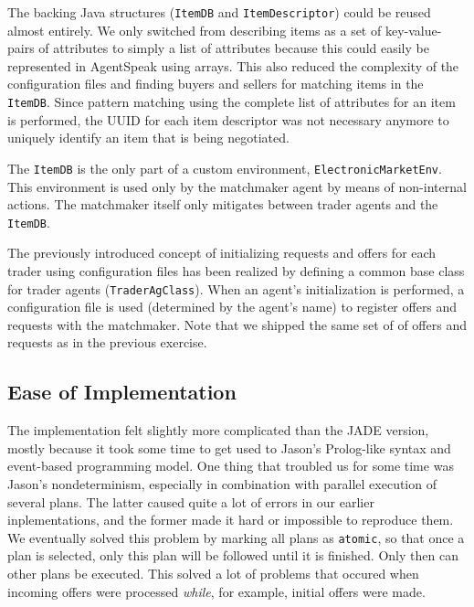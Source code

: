 \documentclass[a4paper,11pt]{article}
\begin{document}
\noindent The backing Java structures (\texttt{ItemDB} and \texttt{ItemDescriptor}) could be reused almost entirely. We only switched from describing items as a set of key-value-pairs of attributes to simply a list of attributes because this could easily be represented in AgentSpeak using arrays. This also reduced the complexity of the configuration files and finding buyers and sellers for matching items in the \texttt{ItemDB}. Since pattern matching using the complete list of attributes for an item is performed, the UUID for each item descriptor was not necessary anymore to uniquely identify an item that is being negotiated.

The \texttt{ItemDB} is the only part of a custom environment, \texttt{ElectronicMarketEnv}. This environment is used only by the matchmaker agent by means of non-internal actions. The matchmaker itself only mitigates between trader agents and the \texttt{ItemDB}.

The previously introduced concept of initializing requests and offers for each trader using configuration files has been realized by defining a common base class for trader agents (\texttt{TraderAgClass}). When an agent's initialization is performed, a configuration file is used (determined by the agent's name) to register offers and requests with the matchmaker. Note that we shipped the same set of of offers and requests as in the previous exercise.


\subsection{Ease of Implementation}
The implementation felt slightly more complicated than the JADE version, mostly because it took some time to get used to Jason's Prolog-like syntax and event-based programming model. One thing that troubled us for some time was Jason's nondeterminism, especially in combination with parallel execution of several plans. The latter caused quite a lot of errors in our earlier inplementations, and the former made it hard or impossible to reproduce them. We eventually solved this problem by marking all plans as \texttt{atomic}, so that once a plan is selected, only this plan will be followed until it is finished. Only then can other plans be executed. This solved a lot of problems that occured when incoming offers were processed \emph{while}, for example, initial offers were made.
\end{document}
